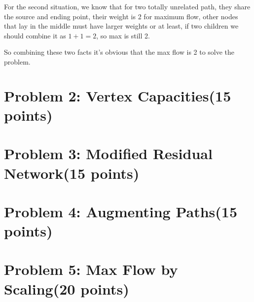 \documentclass{article}
\begin{document}
For the second situation, we know that for two totally unrelated path, they share the source and ending point, their weight is 2 for maximum flow, other nodes that lay in the middle must have larger weights or at least, if two children we should combine it as $ 1 + 1 = 2 $, so max is still 2. 

So combining these two facts it's obvious that the max flow is 2 to solve the problem.

\section{Problem 2: Vertex Capacities(15 points)}



\section{Problem 3: Modified Residual Network(15 points)}



\section{Problem 4:    Augmenting Paths(15 points)}



\section{Problem 5: Max Flow by Scaling(20 points)}
\end{document}
